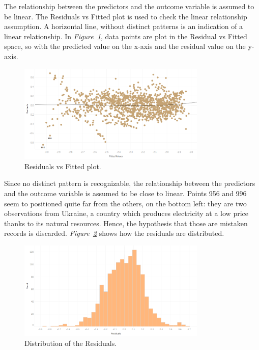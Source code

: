 \documentclass[a4paper,12pt]{book}
\begin{document}
The relationship between the predictors and the outcome variable is assumed to be linear. The Residuals vs Fitted plot is used to check the linear relationship assumption. A horizontal line, without distinct patterns is an indication of a linear relationship. In \textit{Figure~\ref{fig:RvF}}, data points are plot in the Residual vs Fitted space, so with the predicted value on the x-axis and the residual value on the y-axis.

\begin{figure}[tb]
\begin{center}
\captionsetup{justification=centering}
\includegraphics[width=0.8\textwidth]{Images/fitres.png}
\caption{Residuals vs Fitted plot.}
\label{fig:RvF}
\end{center}
\end{figure}

Since no distinct pattern is recognizable, the relationship between the predictors and the outcome variable is assumed to be close to linear. Points 956 and 996 seem to positioned quite far from the others, on the bottom left: they are two observations from Ukraine, a country which produces electricity at a low price thanks to its natural resources. Hence, the hypothesis that those are mistaken records is discarded. \textit{Figure~\ref{fig:disres}} shows how the residuals are distributed.

\begin{figure}[tb]
\begin{center}
\captionsetup{justification=centering}
\includegraphics[width=0.8\textwidth]{Images/distres.png}
\caption{Distribution of the Residuals.}
\label{fig:disres}
\end{center}
\end{figure}
\end{document}
